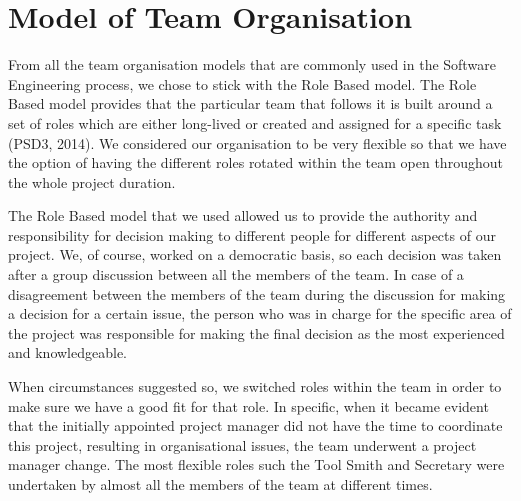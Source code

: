 \documentclass{l3proj}
\begin{document}
\section{Model of Team Organisation}
\par
From all the team organisation models that are commonly used in the Software Engineering process, we chose to stick with the Role Based model. The Role Based model provides that the particular team that follows it is built around a set of roles which are either long-lived or created and assigned for a specific task (PSD3, 2014). We considered our organisation to be very flexible so that we have the option of having the different roles rotated within the team open throughout the whole project duration.
\par
The Role Based model that we used allowed us to provide the authority and responsibility for decision making to different people for different aspects of our project. We, of course, worked on a democratic basis, so each decision was taken after a group discussion between all the members of the team. In case of a disagreement between the members of the team during the discussion for making a decision for a certain issue, the person who was in charge for the specific area of the project was responsible for making the final decision as the most experienced and knowledgeable.
\par
When circumstances suggested so, we switched roles within the team in order to make sure we have a good fit for that role. In specific, when it became evident that the initially appointed project manager did not have the time to coordinate this project, resulting in organisational issues, the team underwent a project manager change. The most flexible roles such the Tool Smith and Secretary were undertaken by almost all the members of the team at different times.


\end{document}
